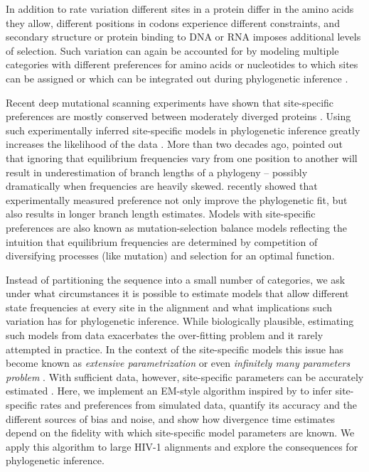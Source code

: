 \documentclass[aps,rmp,twocolumn,linenumbers]{revtex4-1}
\begin{document}
In addition to rate variation different sites in a protein differ in the amino acids they allow, different positions in codons experience different constraints, and secondary structure or protein binding to DNA or RNA imposes additional levels of selection.
Such variation can again be accounted for by modeling multiple categories with different preferences for amino acids or nucleotides to which sites can be assigned or which can be integrated out during phylogenetic inference \citep{Lartillot01062004,kainer_effects_2015,shapiro_choosing_2006}.

Recent deep mutational scanning experiments have shown that site-specific preferences are mostly conserved between moderately diverged proteins \citep{doud_site-specific_2015}.
Using such experimentally inferred site-specific models in phylogenetic inference greatly increases the likelihood of the data \cite{bloom2014experimentally}.
More than two decades ago, \citet{halpern_evolutionary_1998} pointed out that ignoring that equilibrium frequencies vary from one position to another will result in underestimation of branch lengths of a phylogeny -- possibly dramatically when frequencies are heavily skewed.
\citet{hilton_modeling_2018} recently showed that experimentally measured preference not only improve the phylogenetic fit, but also results in longer branch length estimates.
Models with site-specific preferences are also known as mutation-selection balance models \citep{bruno1996modeling,yang2008mutation} reflecting the intuition that equilibrium frequencies are determined by competition of diversifying processes (like mutation) and selection for an optimal function.

Instead of partitioning the sequence into a small number of categories, we ask under what circumstances it is possible to estimate models that allow different state frequencies at every site in the alignment and what implications such variation has for phylogenetic inference.
While biologically plausible, estimating such models from data exacerbates the over-fitting problem and it rarely attempted in practice.
In the context of the site-specific models this issue has become known as {\em extensive parametrization} or even {\em infinitely many parameters problem} \cite{Rodrigue557,spielman2016extensively}.
With sufficient data, however, site-specific parameters can be accurately estimated \citep{tamuri_estimating_2012,spielman2016extensively,scheffler2014validity}.
Here, we implement an EM-style algorithm inspired by \citep{bruno1996modeling} to infer site-specific rates and preferences from simulated data, quantify its accuracy and the different sources of bias and noise, and show how divergence time estimates depend on the fidelity with which site-specific model parameters are known.
We apply this algorithm to large HIV-1 alignments and explore the consequences for phylogenetic inference.
\end{document}
